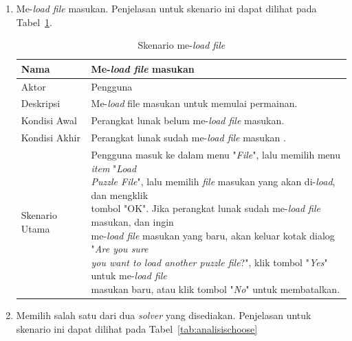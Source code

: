 \begin{enumerate}
\item Me-\textit{load file} masukan. Penjelasan untuk skenario ini dapat dilihat pada Tabel~\ref{tab:analisisload}.

\begin{table}
\centering
\captionsetup{justification=centering}
\caption[Skenario me-\textit{load file}]{Skenario me-\textit{load file}}
\begin{tabular}{| l || l |}
\hline
Nama & Me-\textit{load file} masukan \\
\hline
Aktor & Pengguna \\
\hline
Deskripsi & Me-\textit{load} file masukan untuk memulai permainan. \\
\hline
Kondisi Awal & Perangkat lunak belum me-\textit{load file} masukan. \\
\hline
Kondisi Akhir & Perangkat lunak sudah me-\textit{load file} masukan .\\
\hline
Skenario Utama & \makecell[l]{Pengguna masuk ke dalam menu "\textit{File}", lalu memilih menu \textit{item} "\textit{Load} \\ \textit{Puzzle File}", lalu memilih \textit{file} masukan yang akan di-\textit{load}, dan mengklik \\ tombol "OK". Jika perangkat lunak sudah me-\textit{load file} masukan, dan ingin \\ me-\textit{load file} masukan yang baru, akan keluar kotak dialog "\textit{Are you sure} \\  \textit{you want to load another puzzle file}?", klik tombol "\textit{Yes}" untuk me-\textit{load file} \\ masukan baru, atau klik tombol "\textit{No}" untuk membatalkan.} \\
\hline
\end{tabular}
\label{tab:analisisload}
\end{table}

\item Memilih salah satu dari dua \textit{solver} yang disediakan. Penjelasan untuk skenario ini dapat dilihat pada Tabel~\ref{tab:analisischoose}


\end{enumerate}
